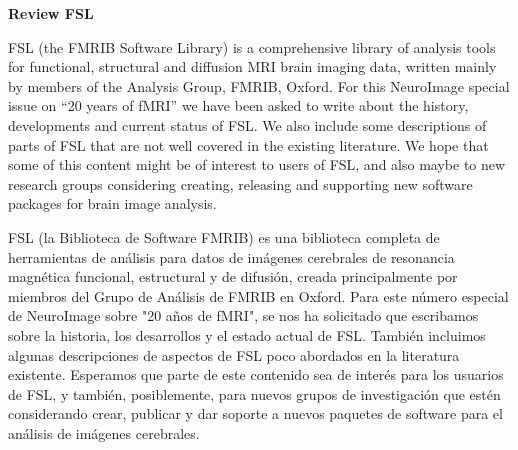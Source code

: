 \documentclass{article}
\begin{document}
\textbf{Review FSL}

\hfill

FSL (the FMRIB Software Library) is a comprehensive library of analysis tools for functional, structural 
and diffusion MRI brain imaging data, written mainly by members of the Analysis Group, FMRIB, Oxford. For 
this NeuroImage special issue on “20 years of fMRI” we have been asked to write about the history, 
developments and current status of FSL. We also include some descriptions of parts of FSL that are not well 
covered in the existing literature. We hope that some of this content might be of interest to users of FSL, 
and also maybe to new research groups considering creating, releasing and supporting new software packages 
for brain image analysis.

{\color{blue}
FSL (la Biblioteca de Software FMRIB) es una biblioteca completa de herramientas de análisis para datos de 
imágenes cerebrales de resonancia magnética funcional, estructural y de difusión, creada principalmente por 
miembros del Grupo de Análisis de FMRIB en Oxford. Para este número especial de NeuroImage sobre "20 años 
de fMRI", se nos ha solicitado que escribamos sobre la historia, los desarrollos y el estado actual de FSL. 
También incluimos algunas descripciones de aspectos de FSL poco abordados en la literatura existente. 
Esperamos que parte de este contenido sea de interés para los usuarios de FSL, y también, posiblemente, 
para nuevos grupos de investigación que estén considerando crear, publicar y dar soporte a nuevos paquetes 
de software para el análisis de imágenes cerebrales.}

 
\end{document}
